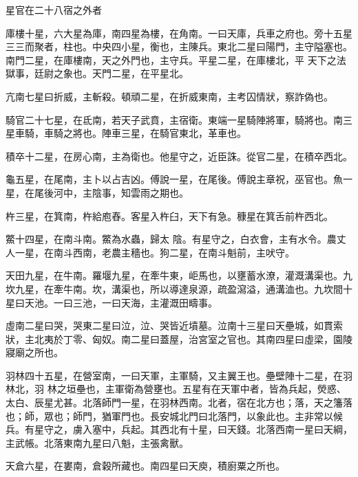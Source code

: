 \begin{pinyinscope}
{{ 星官在二十八宿之外者



 庫樓十星，六大星為庫，南四星為樓，在角南。一曰天庫，兵車之府也。旁十五星三三而聚者，柱也。中央四小星，衡也，主陳兵。東北二星曰陽門，主守隘塞也。南門二星，在庫樓南，天之外門也，主守兵。平星二星，在庫樓北，平
 天下之法獄事，廷尉之象也。天門二星，在平星北。



 亢南七星曰折威，主斬殺。頓頑二星，在折威東南，主考囚情狀，察詐偽也。



 騎官二十七星，在氐南，若天子武賁，主宿衛。東端一星騎陣將軍，騎將也。南三星車騎，車騎之將也。陣車三星，在騎官東北，革車也。



 積卒十二星，在房心南，主為衛也。他星守之，近臣誅。從官二星，在積卒西北。



 龜五星，在尾南，主卜以占吉凶。傅說一星，在尾後。傅說主章祝，巫官也。魚一星，在尾後河中，主陰事，知雲雨之期也。



 杵三星，在箕南，杵給庖舂。客星入杵臼，天下有急。穅星在箕舌前杵西北。



 鱉十四星，在南斗南。鱉為水蟲，歸太
 陰。有星守之，白衣會，主有水令。農丈人一星，在南斗西南，老農主穡也。狗二星，在南斗魁前，主吠守。



 天田九星，在牛南。羅堰九星，在牽牛東，岠馬也，以壅蓄水潦，灌溉溝渠也。九坎九星，在牽牛南。坎，溝渠也，所以導達泉源，疏盈瀉溢，通溝洫也。九坎間十星曰天池。一曰三池，一曰天海，主灌溉田疇事。



 虛南二星曰哭，哭東二星曰泣，泣、哭皆近墳墓。泣南十三星曰天壘城，如貫索狀，主北夷於丁零、匈奴。南二星曰蓋屋，治宮室之官也。其南四星曰虛梁，園陵寢廟之所也。



 羽林四十五星，在營室南，一曰天軍，主軍騎，又主翼王也。壘壁陣十二星，在羽林北，羽
 林之垣壘也，主軍衛為營壅也。五星有在天軍中者，皆為兵起，熒惑、太白、辰星尤甚。北落師門一星，在羽林西南。北者，宿在北方也；落，天之籓落也；師，眾也；師門，猶軍門也。長安城北門曰北落門，以象此也。主非常以候兵。有星守之，虜入塞中，兵起。其西北有十星，曰天錢。北落西南一星曰天綱，主武帳。北落東南九星曰八魁，主張禽獸。



 天倉六星，在婁南，倉穀所藏也。南四星曰天庾，積廚粟之所也。



}}
\end{pinyinscope}

